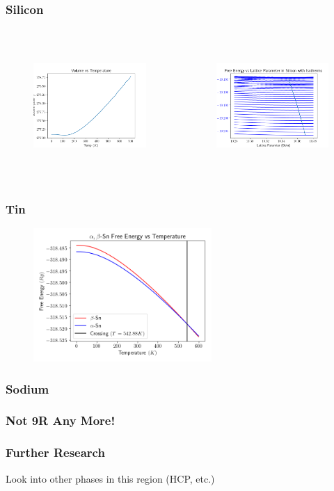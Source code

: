 \documentclass{beamer}
\begin{document}
\begin{frame}
	\frametitle{Silicon}
	\begin{columns}
	\begin{figure}[ht]
	\begin{center}
	\includegraphics[height=2in]{silicon_min_volume.png}
	\end{center}
	\end{figure}
	\begin{figure}[ht]
	\begin{center}
	\includegraphics[height=2in]{silicon_isotherms.png}
	\end{center}
	\end{figure}
\end{columns}
\end{frame}

\begin{frame}
	\frametitle{Tin}
	\begin{figure}[ht]
	\begin{center}
	\includegraphics[height=2in]{tin_transition_temperature.png}
	\end{center}
	\end{figure}
\end{frame}

\begin{frame}
	\frametitle{Sodium}
\end{frame}

\begin{frame}
	\frametitle{Not 9R Any More!}
\end{frame}

\begin{frame}
	\frametitle{Further Research}
	Look into other phases in this region (HCP, etc.)
\end{frame}
\end{document}

